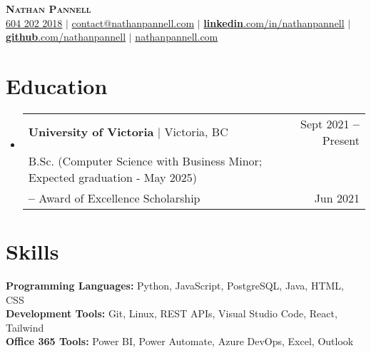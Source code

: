 \documentclass[letterpaper,11pt]{article}
\makeatletter
\newcommand{\resumeEducationHeading}[6]{
  \vspace{-2pt}\item
    \begin{tabular*}{0.97\textwidth}[t]{l@{\extracolsep{\fill}}r}
      #1 & #2 \\
      \small#3 & \small #4 \\
      \small#5 & \small #6 \\
    \end{tabular*}\vspace{-5pt}
}
\newcommand{\resumeSubHeadingListStart}{\begin{itemize}[leftmargin=0.15in, label={}]}
\newcommand{\resumeSubHeadingListEnd}{\end{itemize}}
\makeatother
\begin{document}

\begin{center}
    \textbf{\Huge \scshape Nathan Pannell} \\ \vspace{10pt}
    \small
    \hspace{.5pt} \href{tel:16042022018}{604 202 2018}
    $|$
    \hspace{.5pt} \href{mailto:contact@nathanpannell.com}{contact@nathanpannell.com}
    $|$
    \hspace{.5pt} \href{https://www.linkedin.com/in/nathanpannell}{\textbf{linkedin}.com/in/nathanpannell}
    $|$
    \hspace{.5pt} \href{https://github.com/nathanpannell}{\textbf{github}.com/nathanpannell}
    $|$
    \hspace{.5pt} \href{https://nathanpannell.com}{nathanpannell.com}
\end{center}


\section{Education}
  \vspace{3pt}
  \resumeSubHeadingListStart
    \resumeEducationHeading
      {\textbf{University of Victoria} $|$ Victoria, BC}{Sept 2021 \textbf{--} Present}
      {B.Sc. (Computer Science with Business Minor; Expected graduation - May 2025)}{}
      {\textbf{--} Award of Excellence Scholarship}{Jun 2021}
  \resumeSubHeadingListEnd


\section{Skills}
  \vspace{2pt}
  \resumeSubHeadingListStart
    \small{\item{
        \textbf{Programming Languages:}{ Python, JavaScript, PostgreSQL, Java, HTML, CSS} \\ \vspace{3pt}
        \textbf{Development Tools:}{ Git, Linux, REST APIs, Visual Studio Code, React, Tailwind } \\ \vspace{3pt}
        \textbf{Office 365 Tools:}{ Power BI, Power Automate, Azure DevOps, Excel, Outlook } \\ \vspace{3pt}
    }}
  \resumeSubHeadingListEnd
  
\end{document}
